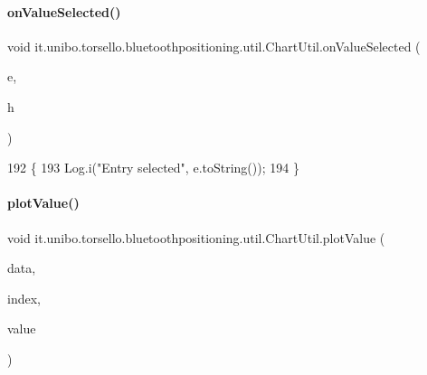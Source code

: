 \paragraph{\texorpdfstring{on\+Value\+Selected()}{onValueSelected()}}
{\footnotesize\ttfamily void it.\+unibo.\+torsello.\+bluetoothpositioning.\+util.\+Chart\+Util.\+on\+Value\+Selected (\begin{DoxyParamCaption}\item[{Entry}]{e,  }\item[{Highlight}]{h }\end{DoxyParamCaption})}


\begin{DoxyCode}
192                                                       \{
193         Log.i(\textcolor{stringliteral}{"Entry selected"}, e.toString());
194     \}
\end{DoxyCode}
\hypertarget{classit_1_1unibo_1_1torsello_1_1bluetoothpositioning_1_1util_1_1ChartUtil_a86398d4aca978fbfc10c71039191635e_a86398d4aca978fbfc10c71039191635e}{}\label{classit_1_1unibo_1_1torsello_1_1bluetoothpositioning_1_1util_1_1ChartUtil_a86398d4aca978fbfc10c71039191635e_a86398d4aca978fbfc10c71039191635e} 
\paragraph{\texorpdfstring{plot\+Value()}{plotValue()}}
{\footnotesize\ttfamily void it.\+unibo.\+torsello.\+bluetoothpositioning.\+util.\+Chart\+Util.\+plot\+Value (\begin{DoxyParamCaption}\item[{Line\+Data}]{data,  }\item[{int}]{index,  }\item[{Double}]{value }\end{DoxyParamCaption})\hspace{0.3cm}{\ttfamily [private]}}


